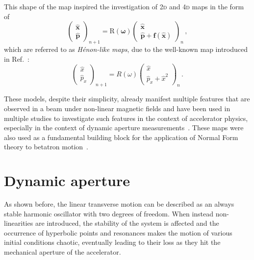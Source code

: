 This shape of the map inspired the investigation of 2\textsc{d} and 4\textsc{d} maps in the form of
\begin{equation}
	\begin{pmatrix}
		\hat{\mathbf{x}} \\ \hat{\mathbf{p}}  
	\end{pmatrix}_{n+1}
	=
	\mathrm{R}(\bm\omega)
		\begin{pmatrix}
			\hat{\mathbf{x}} \\ \hat{\mathbf{p}} + \mathbf{f}(\hat{\mathbf{x}})
	\end{pmatrix}_{n} \,,
	\label{eq:henonlike}
\end{equation}
which are referred to as \textit{Hénon-like maps}, due to the well-known map introduced in Ref.~\cite{henon}:
%
\begin{equation}
	\begin{pmatrix}
		\hat x \\ \hat p_x
	\end{pmatrix}_{n+1}
	=
	R(\omega)
		\begin{pmatrix}
			\hat x \\ \hat p_x + \hat x^2
	\end{pmatrix}_{n} \,.
	\label{eq:simplehenon}
\end{equation}

These models, despite their simplicity, already manifest multiple features that are observed in a beam under non-linear magnetic fields and have been used in multiple studies to investigate such features in the context of accelerator physics, especially in the context of dynamic aperture measurements~\cite{PhysRevE.53.4067, invlog}. These maps were also used as a fundamental building block for the application of Normal Form theory to betatron motion~\cite{Bazzani:262179}.

\section{Dynamic aperture}
\label{sec:2:dynamic_aperture}

As shown before, the linear transverse motion can be described as an always stable harmonic oscillator with two degrees of freedom. When instead non-linearities are introduced, the stability of the system is affected and the occurrence of hyperbolic points and resonances makes the motion of various initial conditions chaotic, eventually leading to their loss as they hit the mechanical aperture of the accelerator.

